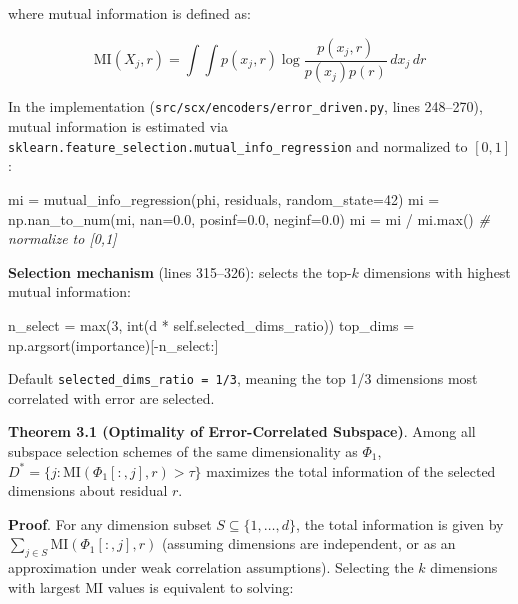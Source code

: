 \documentclass[
  12pt,
]{article}
\newenvironment{Shaded}{}{}
\newcommand{\BuiltInTok}[1]{\textcolor[rgb]{0.00,0.50,0.00}{#1}}
\newcommand{\CommentTok}[1]{\textcolor[rgb]{0.38,0.63,0.69}{\textit{#1}}}
\newcommand{\DecValTok}[1]{\textcolor[rgb]{0.25,0.63,0.44}{#1}}
\newcommand{\FloatTok}[1]{\textcolor[rgb]{0.25,0.63,0.44}{#1}}
\newcommand{\NormalTok}[1]{#1}
\newcommand{\OperatorTok}[1]{\textcolor[rgb]{0.40,0.40,0.40}{#1}}
\newcommand{\VariableTok}[1]{\textcolor[rgb]{0.10,0.09,0.49}{#1}}
\begin{document}
where mutual information is defined as:

\[\text{MI}(X_j, r) = \int \int p(x_j, r) \log \frac{p(x_j, r)}{p(x_j)p(r)} \, dx_j \, dr\]

In the implementation (\texttt{src/scx/encoders/error\_driven.py}, lines 248--270), mutual information is estimated via \texttt{sklearn.feature\_selection.mutual\_info\_regression} and normalized to $[0,1]$:

\begin{Shaded}
\begin{Highlighting}[]
\NormalTok{mi }\OperatorTok{=}\NormalTok{ mutual\_info\_regression(phi, residuals, random\_state}\OperatorTok{=}\DecValTok{42}\NormalTok{)}
\NormalTok{mi }\OperatorTok{=}\NormalTok{ np.nan\_to\_num(mi, nan}\OperatorTok{=}\FloatTok{0.0}\NormalTok{, posinf}\OperatorTok{=}\FloatTok{0.0}\NormalTok{, neginf}\OperatorTok{=}\FloatTok{0.0}\NormalTok{)}
\NormalTok{mi }\OperatorTok{=}\NormalTok{ mi }\OperatorTok{/}\NormalTok{ mi.}\BuiltInTok{max}\NormalTok{()  }\CommentTok{\# normalize to [0,1]}
\end{Highlighting}
\end{Shaded}

\textbf{Selection mechanism} (lines 315--326): selects the top-$k$ dimensions with highest mutual information:

\begin{Shaded}
\begin{Highlighting}[]
\NormalTok{n\_select }\OperatorTok{=} \BuiltInTok{max}\NormalTok{(}\DecValTok{3}\NormalTok{, }\BuiltInTok{int}\NormalTok{(d }\OperatorTok{*} \VariableTok{self}\NormalTok{.selected\_dims\_ratio))}
\NormalTok{top\_dims }\OperatorTok{=}\NormalTok{ np.argsort(importance)[}\OperatorTok{{-}}\NormalTok{n\_select:]}
\end{Highlighting}
\end{Shaded}

Default \texttt{selected\_dims\_ratio\ =\ 1/3}, meaning the top 1/3 dimensions most correlated with error are selected.

\textbf{Theorem 3.1 (Optimality of Error-Correlated Subspace)}. Among all subspace selection schemes of the same dimensionality as $\Phi_1$, $D^* = \{j: \text{MI}(\Phi_1[:, j], r) > \tau\}$ maximizes the total information of the selected dimensions about residual $r$.

\textbf{Proof}. For any dimension subset $S \subseteq \{1,\dots,d\}$, the total information is given by $\sum_{j \in S} \text{MI}(\Phi_1[:, j], r)$ (assuming dimensions are independent, or as an approximation under weak correlation assumptions). Selecting the $k$ dimensions with largest $\text{MI}$ values is equivalent to solving:
\end{document}
